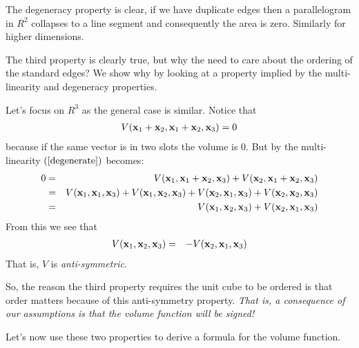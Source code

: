 \documentclass{article}
\begin{document}
The degeneracy property is clear, if we have duplicate edges then a parallelogram
in $R^2$ collapses to a line segment and consequently the area is zero. Similarly
for higher dimensions.

The third property is clearly true, but why the need to care about the ordering
of the standard edges? We show why by looking at a property implied by the
multi-linearity and degeneracy properties.
    
Let's focus on $R^3$ as the general case is similar. Notice that
\begin{eqnarray}
  V({\bf x}_1 + {\bf x}_2, {\bf x}_1 + {\bf x}_2, {\bf x}_3) = 0 \label{degenerate}
\end{eqnarray}
because if the same vector is in two slots the volume is $0$.
But by the multi-linearity $(\ref{degenerate})$ becomes:
\begin{eqnarray}
  0 & = & V({\bf x}_1, {\bf x}_1 + {\bf x}_2, {\bf x}_3)
      +  V({\bf x}_2, {\bf x}_1 + {\bf x}_2, {\bf x}_3) \nonumber \\
    & = & V({\bf x}_1, {\bf x}_1 , {\bf x}_3)
          + V({\bf x}_1, {\bf x}_2, {\bf x}_3)
          +  V({\bf x}_2, {\bf x}_1, {\bf x}_3)
          + V({\bf x}_2, {\bf x}_2, {\bf x}_3) \nonumber \\
  & = & V({\bf x}_1, {\bf x}_2, {\bf x}_3) + V({\bf x}_2, {\bf x}_1, {\bf x}_3)
\end{eqnarray}
From this we see that 
\begin{eqnarray}
  V({\bf x}_1, {\bf x}_2, {\bf x}_3)  & = & - V({\bf x}_2, {\bf x}_1, {\bf x}_3)
\end{eqnarray}
That is, $V$ is {\em anti-symmetric\/}.


So, the reason the third property requires the unit cube to be ordered
is that order matters because of this anti-symmetry property. {\em That is,
a consequence of our assumptions is that the volume function will be
signed!\/}

Let's now use these two properties to derive a formula for the volume
function.
\end{document}

